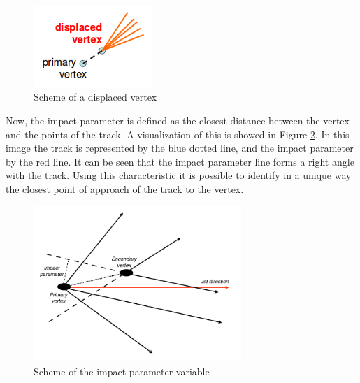  \begin{figure}[h] \label{Displaced_vertices}
 \centering
 \caption{Scheme of a displaced vertex}
 \includegraphics[width=0.4\textwidth]{./Capitulos/VariableDefinitions/Displaced_vertex}  
 \end{figure}
 
Now, the impact parameter is defined as the closest distance between the vertex and the points of the track. A visualization of this is showed in Figure \ref{Impact_parameter}. In this image the track is represented by the blue dotted line, and the impact parameter by the red line. It can be seen that the impact parameter line forms a right angle with the track. Using this characteristic it is possible to identify in a unique way the closest point of approach of the track to the vertex.


 \begin{figure}[h] \label{Impact_parameter}
 \centering
 \caption{Scheme of the impact parameter variable}
 \includegraphics[width=0.7\textwidth]{./Capitulos/VariableDefinitions/Impact_parameter}  
 \end{figure} 

 
 
 
 
 
 
 
 
 
 
 
 
 
 
 
 
 
 
 